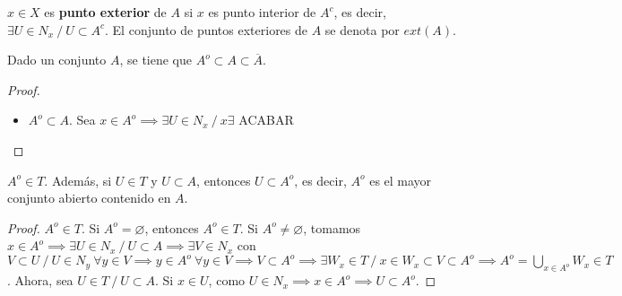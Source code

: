 \begin{ndef}
  $x \in X$ es \textbf{punto exterior} de $A$ si $x$ es punto interior de $A^c$, es decir, $\exists U \in N_x\ /\ U \subset A^c$. El conjunto de puntos exteriores de $A$ se denota por $ext(A)$.
\end{ndef}

\begin{properties}
  Dado un conjunto $A$, se tiene que $A^o \subset A \subset \overline{A}$.
\end{properties}
\begin{proof}
  \begin{itemize}
    \item $A^o \subset A$. Sea $x \in A^o \implies \exists U \in N_x\ /\ x \exists $ ACABAR
  \end{itemize}
\end{proof}
\begin{properties}
  $A^o \in T$. Además, si $U \in T$ y $U \subset A$, entonces $U \subset A^o$, es decir, $A^o$ es el mayor conjunto abierto contenido en $A$.
\end{properties}
\begin{proof}
  $A^o \in T$. Si $A^o = \varnothing $, entonces $A^o \in T$. Si $A^o \neq \varnothing $, tomamos $x \in A^o \implies \exists U \in N_{x}\ /\ U \subset A \implies \exists V \in N_x$ con $V \subset U\ /\ U \in N_y \ \forall y \in V \implies y \in A^o \ \forall y \in V \implies V \subset A^o \implies \exists W_x \in T \ /\ x \in W_x \subset V \subset A^o \implies A^o = \bigcup_{x \in A^o} W_x \in T$. Ahora, sea $U \in T\ /\ U \subset A$. Si $x \in U$, como $U \in N_x \implies x \in A^o \implies U \subset A^o$.
\end{proof}

